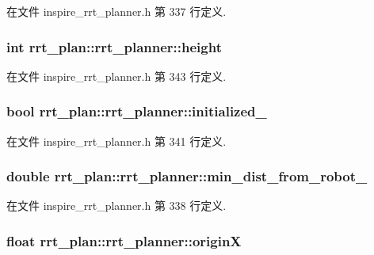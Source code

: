 在文件 inspire\-\_\-rrt\-\_\-planner.\-h 第 337 行定义.

\hypertarget{classrrt__plan_1_1rrt__planner_a3549de56a50bff6494514878b64584df}{
\subsubsection[{height}]{\setlength{\rightskip}{0pt plus 5cm}int rrt\-\_\-plan\-::rrt\-\_\-planner\-::height}}\label{classrrt__plan_1_1rrt__planner_a3549de56a50bff6494514878b64584df}


在文件 inspire\-\_\-rrt\-\_\-planner.\-h 第 343 行定义.

\hypertarget{classrrt__plan_1_1rrt__planner_ac1cd8655573adac056ae922a92337b8d}{
\subsubsection[{initialized\-\_\-}]{\setlength{\rightskip}{0pt plus 5cm}bool rrt\-\_\-plan\-::rrt\-\_\-planner\-::initialized\-\_\-}}\label{classrrt__plan_1_1rrt__planner_ac1cd8655573adac056ae922a92337b8d}


在文件 inspire\-\_\-rrt\-\_\-planner.\-h 第 341 行定义.

\hypertarget{classrrt__plan_1_1rrt__planner_aae70d5e90c66f442c8822b573645e346}{
\subsubsection[{min\-\_\-dist\-\_\-from\-\_\-robot\-\_\-}]{\setlength{\rightskip}{0pt plus 5cm}double rrt\-\_\-plan\-::rrt\-\_\-planner\-::min\-\_\-dist\-\_\-from\-\_\-robot\-\_\-}}\label{classrrt__plan_1_1rrt__planner_aae70d5e90c66f442c8822b573645e346}


在文件 inspire\-\_\-rrt\-\_\-planner.\-h 第 338 行定义.

\hypertarget{classrrt__plan_1_1rrt__planner_a92ba133c58a9ad0de8f425e856953ac1}{
\subsubsection[{origin\-X}]{\setlength{\rightskip}{0pt plus 5cm}float rrt\-\_\-plan\-::rrt\-\_\-planner\-::origin\-X}}\label{classrrt__plan_1_1rrt__planner_a92ba133c58a9ad0de8f425e856953ac1}


